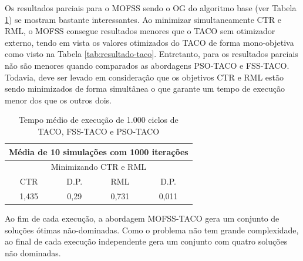 Os resultados parciais para o MOFSS sendo o OG do algoritmo base (ver Tabela \ref{tab:resultado-mofss}) se mostram bastante interessantes. Ao minimizar simultaneamente CTR e RML, o MOFSS consegue resultados menores que o TACO sem otimizador externo, tendo em vista os valores otimizados do TACO de forma mono-objetiva como visto na Tabela \ref{tab:resultado-taco}. Entretanto, para os resultados parciais não são menores quando comparados as abordagens PSO-TACO e FSS-TACO. Todavia, deve ser levado em consideração que os objetivos CTR e RML estão sendo minimizados de forma simultânea o que garante um tempo de execução menor dos que os outros dois.

\begin{table}[htb]
    \centering
    \caption{Tempo médio de execução de 1.000 ciclos de TACO, FSS-TACO e PSO-TACO} \label{tab:resultado-mofss}
    \begin{tabular}{|c|c|c|c|}
    \hline
    \multicolumn{4}{|c|}{Média de 10 simulações com 1000 iterações} \\ \hline
    \multicolumn{4}{|c|}{Minimizando CTR e RML}                     \\ \hline
    CTR            & D.P.          & RML            & D.P.          \\ \hline
    1,435          & 0,29          & 0,731          & 0,011         \\ \hline
    \end{tabular}
    \end{table}

Ao fim de cada execução, a abordagem MOFSS-TACO gera um conjunto de soluções ótimas não-dominadas. Como o problema não tem grande complexidade, ao final de cada execução independente gera um conjunto com quatro soluções não dominadas.